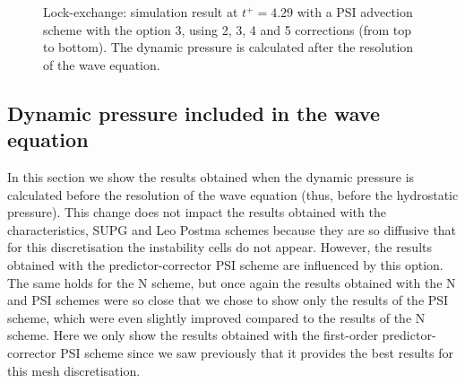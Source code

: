 \begin{figure}[ht]
  \begin{center}
    \caption{Lock-exchange: simulation result at $t^+=4.29$ with a PSI advection scheme with the option 3,
      using 2, 3, 4 and 5 corrections (from top to bottom).
      The dynamic pressure is calculated after the resolution of the wave equation.}
    \label{fig:lock-exchange_dp_no_PSI3}
  \end{center}
\end{figure}

\clearpage

\subsection{Dynamic pressure included in the wave equation}

In this section we show the results obtained when the dynamic pressure is calculated
before the resolution of the wave equation (thus, before the hydrostatic pressure).
This change does not impact the results obtained with the characteristics, SUPG
and Leo Postma schemes
because they are so diffusive that for this discretisation the instability cells
do not appear.
However, the results obtained with the predictor-corrector PSI scheme are
influenced by this option.
The same holds for the N scheme, but once again the results obtained with the N
and PSI schemes were so close that we chose to show only the results of the PSI
scheme, which were even slightly improved compared to the results of the N scheme.
Here we only show the results obtained with the first-order predictor-corrector
PSI scheme since we saw previously that it provides the best results for this
mesh discretisation.


